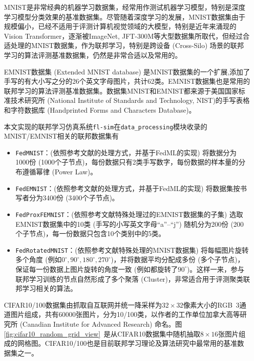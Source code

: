 MNIST是非常经典的机器学习数据集，经常用作测试机器学习模型，特别是深度学习模型分类效果的基准数据集。尽管随着深度学习的发展，MNIST数据集由于规模偏小，已经不适用于评测计算机视觉领域的大模型，特别是近年来涌现的Vision Transformer\cite{dosovitskiy2021_vit}，逐渐被ImageNet\cite{deng2009imagenet}, JFT-300M\cite{Sun_2017_JFT-300M}等大型数据集所取代，但经过合适处理\cite{mcmahan2017fed_avg, caldas2018_leaf, sahu2018fedprox}的MNIST数据集，作为联邦学习，特别是跨设备 (Cross-Silo) 场景的联邦学习的算法评测基准数据集，仍然是非常合适以及常用的\cite{reddi2020fed_opt, tran2021feddr, Ghosh_2022_cfl, li2021pfedmac, t2020pfedme}。

EMNIST数据集 (Extended MNIST database)\cite{cohen2017emnist} 是MNIST数据集的一个扩展,添加了手写的有大小写之分的26个英文字母图片，共计62类。EMNIST数据集也是常用的联邦学习的算法评测基准数据集\cite{sahu2018fedprox, zhang2020fedpd, acar2021feddyn}。数据集MNIST和EMNIST都来源于美国国家标准技术研究所 (National Institute of Standards and Technology, NIST)的手写表格和字符数据库 (Handprinted Forms and Characters Database)\cite{nist-19}。

本文实现的联邦学习仿真系统\texttt{fl-sim}在\texttt{data\_processing}模块收录的MNIST/EMNIST相关的联邦数据集有
\begin{itemize}
    \item \texttt{FedMNIST}：(依照参考文献\parencite{sahu2018fedprox}的处理方式，并基于FedML\cite{he_2020_fedml}的实现) 将数据分为1000份 (1000个子节点)，每份数据只有2类手写数字，每份数据的样本量的分布遵循幂律 (Power Law)。
    \item \texttt{FedEMNIST}：(依照参考文献\parencite[附录C.2]{reddi2020fed_opt}的处理方式，并基于FedML\cite{he_2020_fedml}的实现) 将数据集按书写者分为3400份 (3400个子节点)。
    \item \texttt{FedProxFEMNIST}：(依照参考文献\parencite{sahu2018fedprox}特殊处理过的EMNIST数据集的子集) 选取EMNIST数据集中的10类 (手写的小写英文字母``a''--``j'') 随机分为200份 (200个子节点)，每一份数据只包含10个类别中的5类。
    \item \texttt{FedRotatedMNIST}：(依照参考文献\parencite{Ghosh_2022_cfl}特殊处理的MNIST数据集) 将每幅图片旋转多个角度 (例如$0^\circ, 90^\circ, 180^\circ, 270^\circ$)，并将数据平均分配成多份 (多个子节点)，保证每一份数据上图片旋转的角度一致 (例如都旋转了$90^\circ$)。这样一来，参与联邦学习训练的节点自然形成了多个聚落 (Cluster)，非常适合用于评测聚类联邦学习相关的算法。
\end{itemize}

CIFAR10/100数据集\cite{cifar}由抓取自互联网并统一降采样为$32\times 32$像素大小的RGB~3通道图片组成，共有60000张图片，分为10/100类，以作者的工作单位加拿大高等研究所 (Canadian Institute for Advanced Research) 命名。图\ref{fig:cifar10_random_grid_view}~是从CIFAR10数据集中随机抽取$8\times 16$张图片组成的网格图。CIFAR10/100也是目前联邦学习理论及算法研究中最常用的基准数据集之一\cite{zhang2020fedpd, acar2021feddyn, Ghosh_2022_cfl}。

